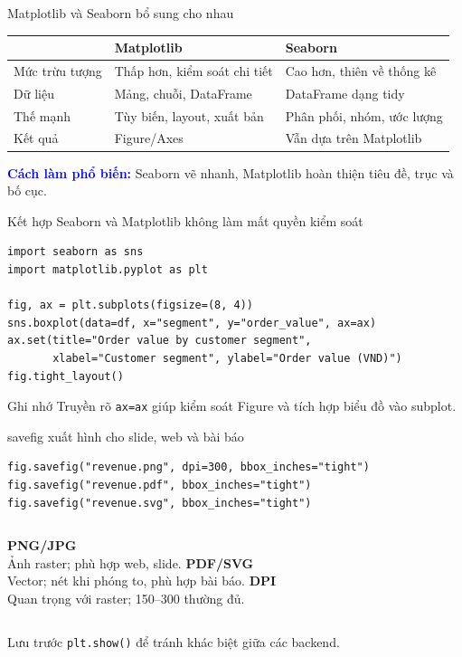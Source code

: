 \documentclass[aspectratio=169,12pt]{beamer}
\newcommand{\key}[1]{\textcolor{Blue}{\textbf{#1}}}
\newcommand{\muted}[1]{\textcolor{Muted}{#1}}
\begin{document}
\begin{frame}{Matplotlib và Seaborn bổ sung cho nhau}
\small
\begin{tabularx}{\textwidth}{@{}p{3.5cm}XX@{}}
\toprule
 & \textbf{Matplotlib} & \textbf{Seaborn} \\
\midrule
Mức trừu tượng & Thấp hơn, kiểm soát chi tiết & Cao hơn, thiên về thống kê \\
Dữ liệu & Mảng, chuỗi, DataFrame & DataFrame dạng tidy \\
Thế mạnh & Tùy biến, layout, xuất bản & Phân phối, nhóm, ước lượng \\
Kết quả & Figure/Axes & Vẫn dựa trên Matplotlib \\
\bottomrule
\end{tabularx}
\vspace{4mm}
\begin{center}\key{Cách làm phổ biến:} Seaborn vẽ nhanh, Matplotlib hoàn thiện tiêu đề, trục và bố cục.\end{center}
\end{frame}

\begin{frame}[fragile]{Kết hợp Seaborn và Matplotlib không làm mất quyền kiểm soát}
\begin{lstlisting}[style=py]
import seaborn as sns
import matplotlib.pyplot as plt

fig, ax = plt.subplots(figsize=(8, 4))
sns.boxplot(data=df, x="segment", y="order_value", ax=ax)
ax.set(title="Order value by customer segment",
       xlabel="Customer segment", ylabel="Order value (VND)")
fig.tight_layout()
\end{lstlisting}
\begin{block}{Ghi nhớ}
Truyền rõ \texttt{ax=ax} giúp kiểm soát Figure và tích hợp biểu đồ vào subplot.
\end{block}
\end{frame}

\begin{frame}[fragile]{savefig xuất hình cho slide, web và bài báo}
\begin{lstlisting}[style=py]
fig.savefig("revenue.png", dpi=300, bbox_inches="tight")
fig.savefig("revenue.pdf", bbox_inches="tight")
fig.savefig("revenue.svg", bbox_inches="tight")
\end{lstlisting}
\begin{columns}[T,onlytextwidth]
\textbf{PNG/JPG}\\Ảnh raster; phù hợp web, slide.
\textbf{PDF/SVG}\\Vector; nét khi phóng to, phù hợp bài báo.
\textbf{DPI}\\Quan trọng với raster; 150--300 thường đủ.
\end{columns}
\vspace{4mm}
\muted{Lưu trước \texttt{plt.show()} để tránh khác biệt giữa các backend.}
\end{frame}
\end{document}
